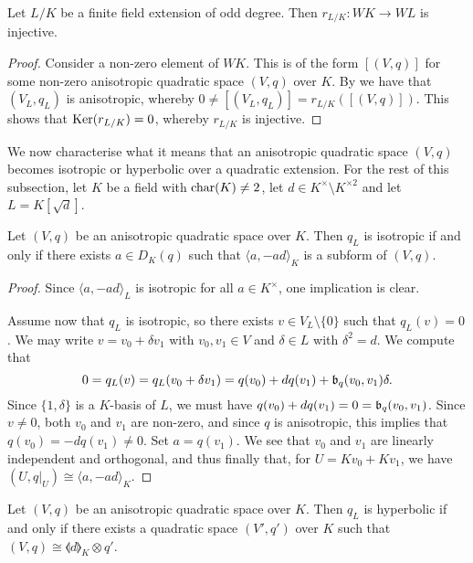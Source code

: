 \documentclass[12pt, leqno, british]{amsart}
\begin{document}
\begin{cor}
Let $L/K$ be a finite field extension of odd degree.
Then $r_{L/K} : WK \to WL$ is injective.
\end{cor}
\begin{proof}
Consider a non-zero element of $WK$.
This is of the form $[(V, q)]$ for some non-zero anisotropic quadratic space $(V, q)$ over $K$.
By  we have that $(V_L, q_L)$ is anisotropic, whereby $0 \neq [(V_L, q_L)] = r_{L/K}([(V, q)])$.
This shows that $\operatorname{Ker}(r_{L/K}) = 0$, whereby $r_{L/K}$ is injective.
\end{proof}

We now characterise what it means that an anisotropic quadratic space $(V, q)$ becomes isotropic or hyperbolic over a quadratic extension.
For the rest of this subsection, let $K$ be a field with $\operatorname{char}(K) \neq 2$, let $d \in K^\times \setminus K^{\times 2}$ and let $L = K[\sqrt{d}]$.
\begin{prop}\label{P:isotropic-quadratic-extension}
Let $(V, q)$ be an anisotropic quadratic space over $K$.
Then $q_L$ is isotropic if and only if there exists $a \in D_K(q)$ such that $\langle a, -ad \rangle_K$ is a subform of $(V, q)$.
\end{prop}
\begin{proof}
Since $\langle a, -ad \rangle_L$ is isotropic for all $a \in K^\times$, one implication is clear.

Assume now that $q_L$ is isotropic, so there exists $v \in V_L \setminus \lbrace 0 \rbrace$ such that $q_L(v) = 0$.
We may write $v = v_0 + \delta v_1$ with $v_0, v_1 \in V$ and $\delta \in L$ with $\delta^2 = d$.
We compute that
$$0 = q_L(v) = q_L(v_0 + \delta v_1) = q(v_0) + dq(v_1) + \mathfrak{b}_q(v_0, v_1)\delta.$$
Since $\lbrace 1, \delta \rbrace$ is a $K$-basis of $L$, we must have $q(v_0) + dq(v_1) = 0 = \mathfrak{b}_q(v_0, v_1)$.
Since $v \neq 0$, both $v_0$ and $v_1$ are non-zero, and since $q$ is anisotropic, this implies that $q(v_0) = -dq(v_1) \neq 0$.
Set $a = q(v_1)$.
We see that $v_0$ and $v_1$ are linearly independent and orthogonal, and thus finally that, for $U = Kv_0 + Kv_1$, we have $(U, q\vert_U) \cong \langle a, -ad \rangle_K$.
\end{proof}
\begin{cor}
Let $(V, q)$ be an anisotropic quadratic space over $K$.
Then $q_L$ is hyperbolic if and only if there exists a quadratic space $(V', q')$ over $K$ such that $(V, q) \cong \llangle d \rrangle_K \otimes q'$.
\end{cor}
\end{document}

